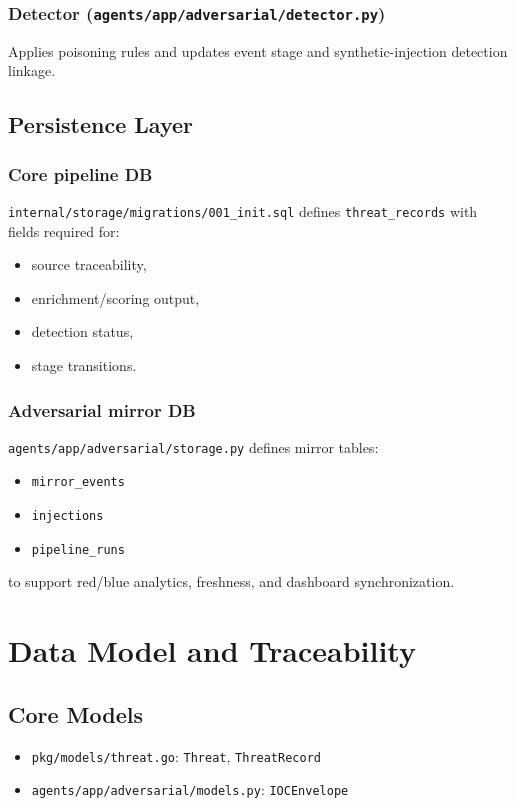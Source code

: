 \documentclass[11pt,a4paper]{article}
\begin{document}
\subsubsection*{Detector (\texttt{agents/app/adversarial/detector.py})}
Applies poisoning rules and updates event stage and synthetic-injection detection linkage.

\subsection{Persistence Layer}

\subsubsection*{Core pipeline DB}
\texttt{internal/storage/migrations/001\_init.sql} defines \texttt{threat\_records} with fields required for:
\begin{itemize}[leftmargin=1.5em]
    \item source traceability,
    \item enrichment/scoring output,
    \item detection status,
    \item stage transitions.
\end{itemize}

\subsubsection*{Adversarial mirror DB}
\texttt{agents/app/adversarial/storage.py} defines mirror tables:
\begin{itemize}[leftmargin=1.5em]
    \item \texttt{mirror\_events}
    \item \texttt{injections}
    \item \texttt{pipeline\_runs}
\end{itemize}
to support red/blue analytics, freshness, and dashboard synchronization.

\section{Data Model and Traceability}

\subsection{Core Models}
\begin{itemize}[leftmargin=1.5em]
    \item \texttt{pkg/models/threat.go}: \texttt{Threat}, \texttt{ThreatRecord}
    \item \texttt{agents/app/adversarial/models.py}: \texttt{IOCEnvelope}
\end{itemize}
\end{document}
